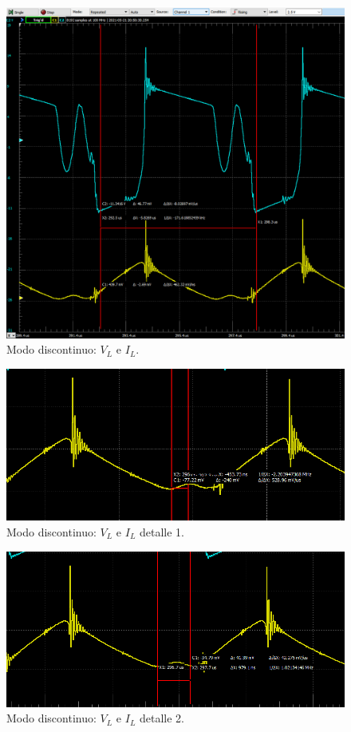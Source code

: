 \begin{figure}[H]
	\centering
	\includegraphics[width=\linewidth]{Imagenes/Discontinuo_VL_IL_1}
	\caption{Modo discontinuo: $V_L$ e $I_L$.}
	\label{fig:DISC_VL_IL}
\end{figure}


\begin{figure}[H]
	\centering
	\includegraphics[width=\linewidth]{Imagenes/Discontinuo_VL_IL_2}
	\caption{Modo discontinuo: $V_L$ e $I_L$ detalle 1.}
	\label{fig:DISC_VL_IL_2}
\end{figure}
\begin{figure}[H]
	\centering
	\includegraphics[width=\linewidth]{Imagenes/Discontinuo_VL_IL_3}
	\caption{Modo discontinuo: $V_L$ e $I_L$ detalle 2.}
	\label{fig:DISC_VL_IL_3}
\end{figure}

